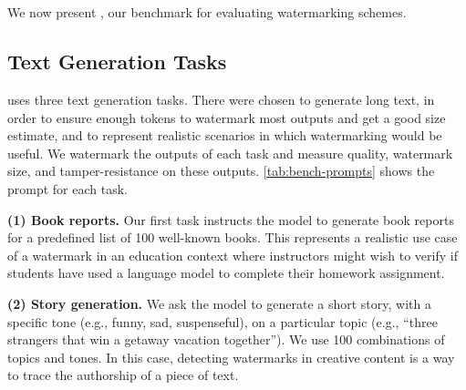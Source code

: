 \section{\benchmarkname{}}
\label{sec:experiments}



%
We now present \benchmarkname{}, our benchmark for evaluating watermarking schemes.

\subsection{Text Generation Tasks}

%

\benchmarkname{} uses three text generation tasks.
There were chosen to generate long text, in order to ensure enough tokens to watermark most outputs and get a good size estimate,
and to represent realistic scenarios in which watermarking would be useful.
We watermark the outputs of each task and measure quality, watermark size, and tamper-resistance on these outputs.
\cref{tab:bench-prompts} shows the prompt for each task.

\smallskip\noindent\textbf{(1) Book reports.}
%
Our first task instructs the model to generate book reports for a predefined list of 100 well-known books.
%
This represents a realistic use case of a watermark in an education context where instructors might wish to verify if students have used a language 
model to complete their homework assignment.
%

\smallskip\noindent\textbf{(2) Story generation.}
%
We ask the model to generate a short story, with a specific tone (e.g., funny, sad, suspenseful), on a particular topic (e.g., ``three strangers that win a getaway vacation together'').
%
We use 100 combinations of topics and tones.
%
In this case, detecting watermarks in creative content is a way to trace the authorship of a 
piece of text.

